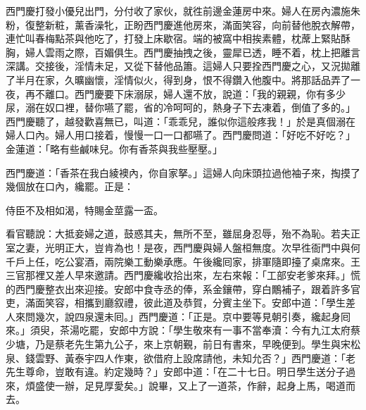 西門慶打發小優兒出門，分付收了家伙，就徃前邊金蓮房中來。婦人在房內濃施朱粉，復整新粧，薰香澡牝，正盼西門慶進他房來，滿面笑容，向前替他脫衣解帶，連忙叫春梅點茶與他吃了，打發上床歇宿。端的被窩中相挨素體，枕蓆上緊貼酥胸，婦人雲雨之際，百媚俱生。西門慶抽拽之後，靈犀已透，睡不着，枕上把離言深講。交接後，淫情未足，又從下替他品簫。這婦人只要拴西門慶之心，又況拋離了半月在家，久曠幽懷，淫情似火，得到身，恨不得鑽入他腹中。將那話品弄了一夜，再不離口。西門慶要下床溺尿，婦人還不放，說道：「我的親親，你有多少尿，溺在奴口裡，替你嚥了罷，省的冷呵呵的，熱身子下去凍着，倒值了多的。」{}西門慶聽了，越發歡喜無已，叫道：「乖乖兒，誰似你這般疼我！」於是真個溺在婦人口內。婦人用口接着，慢慢一口一口都嚥了。西門慶問道：「好吃不好吃？」{}金蓮道：「略有些鹹味兒。{}你有香茶與我些壓壓。」

西門慶道：「香茶在我白綾襖內，你自家拏。」這婦人向床頭拉過他袖子來，掏摸了幾個放在口內，纔罷。正是：

\begin{myquote}
侍臣不及相如渴，特賜金莖露一盃。
\end{myquote}

看官聽說：大抵妾婦之道，鼓惑其夫，無所不至，雖屈身忍辱，殆不為恥。若夫正室之妻，光明正大，豈肯為也！是夜，西門慶與婦人盤桓無度。次早徃衙門中與何千戶上任，吃公宴酒，兩院樂工動樂承應。午後纔囘家，排軍隨即擡了桌席來。王三官那裡又差人早來邀請。西門慶纔收拾出來，左右來報：「工部安老爹來拜。」慌的西門慶整衣出來迎接。安郎中食寺丞的俸，系金鑲帶，穿白鷳補子，跟着許多官吏，滿面笑容，相攜到廳叙禮，彼此道及恭賀，分賓主坐下。安郎中道：「學生差人來問幾次，說四泉還未囘。」西門慶道：「正是。京中要等見朝引奏，纔起身囘來。」須臾，茶湯吃罷，安郎中方說：「學生敬來有一事不當奉瀆：今有九江太府蔡少塘，乃是蔡老先生第九公子，來上京朝覲，前日有書來，早晚便到。學生與宋松泉、錢雲野、黃泰宇四人作東，欲借府上設席請他，未知允否？」西門慶道：「老先生尊命，豈敢有違。約定幾時？」安郎中道：「在二十七日。明日學生送分子過來，煩盛使一辦，足見厚愛矣。」說畢，又上了一道茶，作辭，起身上馬，喝道而去。


